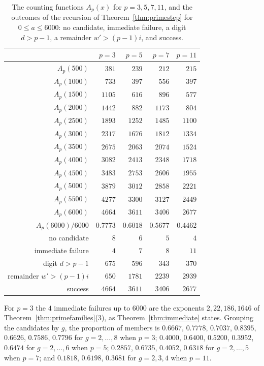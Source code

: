 \documentclass[11pt]{amsart}
\theoremstyle{definition}
\begin{document}
\begin{table}[H]
\centering
\caption{The counting functions $A_p(x)$ for $p=3,5,7,11$, and the outcomes of the recursion of Theorem~\ref{thm:primestep} for $0\le a\le6000$: no candidate, immediate failure, a digit $d>p-1$, a remainder $w'>(p-1)i$, and success.}
\label{tab:primes}
\begin{tabular}{rrrrr}
\toprule
 & $p=3$ & $p=5$ & $p=7$ & $p=11$\\
\midrule
$A_p(500)$ & $381$ & $239$ & $212$ & $215$\\
$A_p(1000)$ & $733$ & $397$ & $556$ & $397$\\
$A_p(1500)$ & $1105$ & $616$ & $896$ & $577$\\
$A_p(2000)$ & $1442$ & $882$ & $1173$ & $804$\\
$A_p(2500)$ & $1893$ & $1252$ & $1485$ & $1100$\\
$A_p(3000)$ & $2317$ & $1676$ & $1812$ & $1334$\\
$A_p(3500)$ & $2675$ & $2063$ & $2074$ & $1524$\\
$A_p(4000)$ & $3082$ & $2413$ & $2348$ & $1718$\\
$A_p(4500)$ & $3483$ & $2753$ & $2606$ & $1955$\\
$A_p(5000)$ & $3879$ & $3012$ & $2858$ & $2221$\\
$A_p(5500)$ & $4277$ & $3300$ & $3127$ & $2449$\\
$A_p(6000)$ & $4664$ & $3611$ & $3406$ & $2677$\\
$A_p(6000)/6000$ & $0.7773$ & $0.6018$ & $0.5677$ & $0.4462$\\
\midrule
no candidate & $8$ & $6$ & $5$ & $4$\\
immediate failure & $4$ & $7$ & $8$ & $11$\\
digit $d>p-1$ & $675$ & $596$ & $343$ & $370$\\
remainder $w'>(p-1)i$ & $650$ & $1781$ & $2239$ & $2939$\\
success & $4664$ & $3611$ & $3406$ & $2677$\\
\bottomrule
\end{tabular}
\end{table}

For $p=3$ the $4$ immediate failures up to $6000$ are the exponents $2,22,186,1646$ of Theorem~\ref{thm:primefamilies}(3), as Theorem~\ref{thm:immediate} states. Grouping the candidates by $g$, the proportion of members is $0.6667$, $0.7778$, $0.7037$, $0.8395$, $0.6626$, $0.7586$, $0.7796$ for $g=2,\dots,8$ when $p=3$; $0.4000$, $0.6400$, $0.5200$, $0.3952$, $0.6474$ for $g=2,\dots,6$ when $p=5$; $0.2857$, $0.6735$, $0.4052$, $0.6318$ for $g=2,\dots,5$ when $p=7$; and $0.1818$, $0.6198$, $0.3681$ for $g=2,3,4$ when $p=11$.
\end{document}
